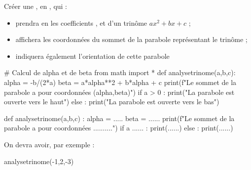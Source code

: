 \documentclass[a4paper,11pt]{article}
\begin{document}
\medskip


\medskip

Créer une , en \calgpython, qui :

\begin{itemize}
	\item prendra en  les coefficients ,  et  d'un trinôme $ax^2+bx+c$ ;
	\item affichera les coordonnées du sommet de la parabole représentant le trinôme ;
	\item indiquera également l'orientation de cette parabole
\end{itemize}

\begin{pyconcode}
# Calcul de alpha et de beta
from math import *
def analysetrinome(a,b,c):
	alpha = -b/(2*a)
	beta = a*alpha**2 + b*alpha + c
	print(f"Le sommet de la parabole a pour coordonnées ({alpha},{beta})")
	if a > 0 :
		print("La parabole est ouverte vers le haut")
	else :
		print("La parabole est ouverte vers le bas")

\end{pyconcode}

\begin{tcpythoncodeno}[15cm]
	\begin{pyverbatim}[][fontsize=\footnotesize,numbers=none]
		def analysetrinome(a,b,c) :
			alpha = .....
			beta = ......
			print(f"Le sommet de la parabole a pour coordonnées ..........")
			if a ...... :
				print(......)
			else :
				print(......)
	\end{pyverbatim}
\end{tcpythoncodeno}

On devra avoir, par exemple :

\begin{consolepython}[15cm]
\begin{pyconsole}[][framesep=3mm,frame=single,label={[\scriptsize Début de la console \logopython]\scriptsize Fin de la console \logopython},fontsize=\footnotesize,framerule=1pt,rulecolor=\color{ForestGreen}]
analysetrinome(-1,2,-3)
\end{pyconsole}
\end{consolepython}
\end{document}
